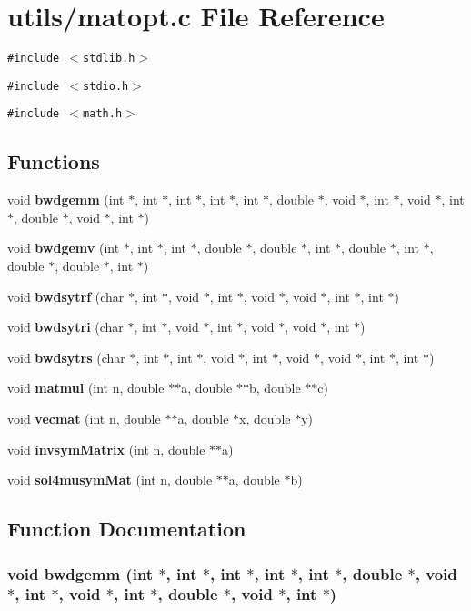 \section{utils/matopt.c File Reference}
\label{matopt_8c}
{\tt \#include $<$stdlib.h$>$}\par
{\tt \#include $<$stdio.h$>$}\par
{\tt \#include $<$math.h$>$}\par
\subsection*{Functions}
\begin{CompactItemize}
\item 
void {\bf bwdgemm} (int $\ast$, int $\ast$, int $\ast$, int $\ast$, int $\ast$, double $\ast$, void $\ast$, int $\ast$, void $\ast$, int $\ast$, double $\ast$, void $\ast$, int $\ast$)
\item 
void {\bf bwdgemv} (int $\ast$, int $\ast$, int $\ast$, double $\ast$, double $\ast$, int $\ast$, double $\ast$, int $\ast$, double $\ast$, double $\ast$, int $\ast$)
\item 
void {\bf bwdsytrf} (char $\ast$, int $\ast$, void $\ast$, int $\ast$, void $\ast$, void $\ast$, int $\ast$, int $\ast$)
\item 
void {\bf bwdsytri} (char $\ast$, int $\ast$, void $\ast$, int $\ast$, void $\ast$, void $\ast$, int $\ast$)
\item 
void {\bf bwdsytrs} (char $\ast$, int $\ast$, int $\ast$, void $\ast$, int $\ast$, void $\ast$, void $\ast$, int $\ast$, int $\ast$)
\item 
void {\bf matmul} (int n, double $\ast$$\ast$a, double $\ast$$\ast$b, double $\ast$$\ast$c)
\item 
void {\bf vecmat} (int n, double $\ast$$\ast$a, double $\ast$x, double $\ast$y)
\item 
void {\bf invsym\-Matrix} (int n, double $\ast$$\ast$a)
\item 
void {\bf sol4musym\-Mat} (int n, double $\ast$$\ast$a, double $\ast$b)
\end{CompactItemize}


\subsection{Function Documentation}
\subsubsection{\setlength{\rightskip}{0pt plus 5cm}void bwdgemm (int $\ast$, int $\ast$, int $\ast$, int $\ast$, int $\ast$, double $\ast$, void $\ast$, int $\ast$, void $\ast$, int $\ast$, double $\ast$, void $\ast$, int $\ast$)}\label{matopt_8c_3f8d685a8afd1cbd0ae3c1742e25397d}


